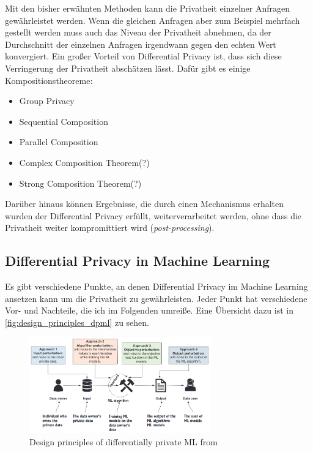 Mit den bisher erwähnten Methoden kann die Privatheit einzelner Anfragen gewährleistet werden. Wenn die gleichen Anfragen aber zum Beispiel mehrfach gestellt werden muss auch das Niveau der Privatheit abnehmen, da der Durchschnitt der einzelnen Anfragen irgendwann gegen den echten Wert konvergiert.\cite[p.42]{dwork:2014} Ein großer Vorteil von Differential Privacy ist, dass sich diese Verringerung der Privatheit abschätzen lässt. Dafür gibt es einige Kompositionstheoreme:

\begin{itemize}
	\item Group Privacy
	\item Sequential Composition
	\item Parallel Composition
	\item Complex Composition Theorem(?)
	\item Strong Composition Theorem(?)\cite{dwork:2010}
\end{itemize}

Darüber hinaus können Ergebnisse, die durch einen Mechanismus erhalten wurden der Differential Privacy erfüllt, weiterverarbeitet werden, ohne dass die Privatheit weiter kompromittiert wird (\textit{post-processing}).\cite{dwork:2014}

\subsection{Differential Privacy in Machine Learning}
Es gibt verschiedene Punkte, an denen Differential Privacy im Machine Learning ansetzen kann um die Privatheit zu gewährleisten. Jeder Punkt hat verschiedene Vor- und Nachteile, die ich im Folgenden umreiße. Eine Übersicht dazu ist in \autoref{fig:design_principles_dpml} zu sehen.

\begin{figure}[tb]
	\centering
	\includegraphics[width=0.7\textwidth]{Bilder/design_principles_dpml.png}
	\caption{Design principles of differentially private ML from \textcite{chang:2023}}
	\label{fig:design_principles_dpml}
\end{figure}


